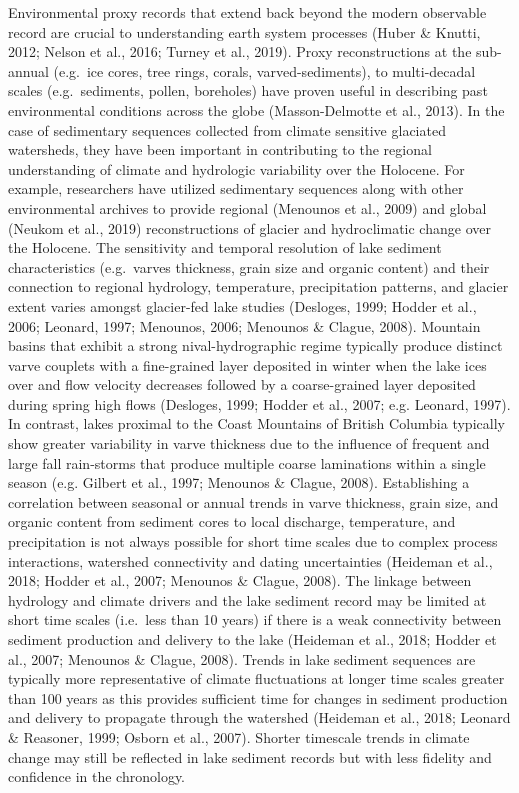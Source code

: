 \documentclass[
  letterpaper,
  DIV=11,
  numbers=noendperiod]{scrartcl}
\begin{document}
Environmental proxy records that extend back beyond the modern
observable record are crucial to understanding earth system processes
(Huber \& Knutti, 2012; Nelson et al., 2016; Turney et al., 2019). Proxy
reconstructions at the sub-annual (e.g.~ice cores, tree rings, corals,
varved-sediments), to multi-decadal scales (e.g.~sediments, pollen,
boreholes) have proven useful in describing past environmental
conditions across the globe (Masson-Delmotte et al., 2013). In the case
of sedimentary sequences collected from climate sensitive glaciated
watersheds, they have been important in contributing to the regional
understanding of climate and hydrologic variability over the Holocene.
For example, researchers have utilized sedimentary sequences along with
other environmental archives to provide regional (Menounos et al., 2009)
and global (Neukom et al., 2019) reconstructions of glacier and
hydroclimatic change over the Holocene. The sensitivity and temporal
resolution of lake sediment characteristics (e.g.~varves thickness,
grain size and organic content) and their connection to regional
hydrology, temperature, precipitation patterns, and glacier extent
varies amongst glacier-fed lake studies (Desloges, 1999; Hodder et al.,
2006; Leonard, 1997; Menounos, 2006; Menounos \& Clague, 2008). Mountain
basins that exhibit a strong nival-hydrographic regime typically produce
distinct varve couplets with a fine-grained layer deposited in winter
when the lake ices over and flow velocity decreases followed by a
coarse-grained layer deposited during spring high flows (Desloges, 1999;
Hodder et al., 2007; e.g. Leonard, 1997). In contrast, lakes proximal to
the Coast Mountains of British Columbia typically show greater
variability in varve thickness due to the influence of frequent and
large fall rain-storms that produce multiple coarse laminations within a
single season (e.g. Gilbert et al., 1997; Menounos \& Clague, 2008).
Establishing a correlation between seasonal or annual trends in varve
thickness, grain size, and organic content from sediment cores to local
discharge, temperature, and precipitation is not always possible for
short time scales due to complex process interactions, watershed
connectivity and dating uncertainties (Heideman et al., 2018; Hodder et
al., 2007; Menounos \& Clague, 2008). The linkage between hydrology and
climate drivers and the lake sediment record may be limited at short
time scales (i.e.~less than 10 years) if there is a weak connectivity
between sediment production and delivery to the lake (Heideman et al.,
2018; Hodder et al., 2007; Menounos \& Clague, 2008). Trends in lake
sediment sequences are typically more representative of climate
fluctuations at longer time scales greater than 100 years as this
provides sufficient time for changes in sediment production and delivery
to propagate through the watershed (Heideman et al., 2018; Leonard \&
Reasoner, 1999; Osborn et al., 2007). Shorter timescale trends in
climate change may still be reflected in lake sediment records but with
less fidelity and confidence in the chronology.
\end{document}

